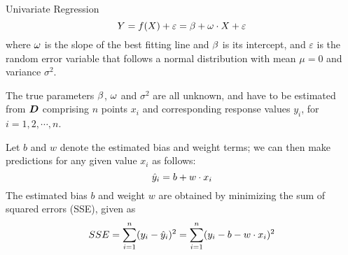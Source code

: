 \begin{frame}{Univariate Regression}
\begin{equation*}
    Y = f(X) + \varepsilon = \beta + \omega \cdot X + \varepsilon
\end{equation*}
where $\omega$ is the slope of the best fitting line and $\beta$ is its
intercept, and $\varepsilon$ is the random error variable that follows a
normal distribution with mean $\mu=0$ and variance $\sigma^2$. 
%
%
%
\medskip

The true parameters $\beta$, $\omega$ and $\sigma^2$ are all unknown, and have to
be estimated from %
${\boldsymbol D}$ comprising $n$ points $x_i$
and corresponding response values $y_i$, for $i=1,2,\cdots,n$. 

	\medskip

Let
$b$ and $w$ denote the estimated bias and weight terms;
we can then make predictions for
any given value $x_i$ as follows:
\begin{equation*}
    \hat{y}_i =  b + w \cdot x_i
\end{equation*}
The estimated bias $b$ and weight $w$ are obtained 
by minimizing the sum of
squared errors (SSE), given as
\begin{align*}
    SSE = \sum_{i=1}^n (y_i - \hat{y}_i)^2 = \sum^{n}_{i=1} (y_i - b - w
    \cdot x_i)^2 
\end{align*}
\end{frame}
